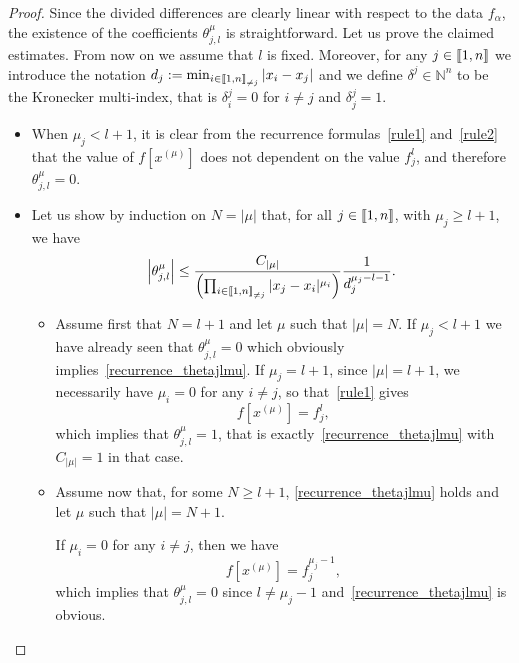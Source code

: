 \documentclass[11pt]{article}
\theoremstyle{definition}
\numberwithin{equation}{section}
\numberwithin{figure}{section}
\numberwithin{table}{section}
\newcommand{\llbracket}{\mathopen{[\mkern -2.7mu[}}
\newcommand{\rrbracket}{\mathclose{]\mkern -2.7mu]}}
\newcommand{\inter}[2]{\llbracket #1,#2 \rrbracket}
\newcommand{\interexclu}[3]{\llbracket #1,#2\rrbracket_{\neq #3}}
\newcommand{\N}{\mathbb{N}}
\begin{document}
\begin{proof}
Since the divided differences are clearly linear with respect to the data $f_\alpha$, the existence of the coefficients $\theta_{j,l}^\mu$ is straightforward. Let us prove the claimed estimates. From now on we assume that $l$ is fixed. Moreover, for any $j\in \inter{1}{n}$ we introduce the notation $d_j:= \min_{i\in\interexclu{1}{n}{j}} |x_i-x_j|$ and we define $\delta^j\in \N^n$ to be the Kronecker multi-index, that is $\delta_i^j=0$ for $i\neq j$ and $\delta_j^j=1$.
\begin{itemize}
\item When $\mu_j<l+1$, it is clear from the recurrence formulas~\eqref{rule1} and~\eqref{rule2} that the value of $f[x^{(\mu)}]$ does not dependent on the value $f_j^l$, and therefore $\theta_{j,l}^\mu=0$.
\item Let us show by induction on $N=|\mu|$ that, for all $j\in \inter{1}{n}$, with $\mu_j\geq l+1$, we have
\begin{equation}\label{recurrence_thetajlmu}
\left|\theta_{j,l}^\mu\right| \leq \frac{C_{|\mu|}}{\left(\prod_{i\in\interexclu{1}{n}{j}} |x_j-x_i|^{\mu_i}\right)} \frac{1}{d_j^{\mu_j-l-1}}.
\end{equation}
\begin{itemize}
\item Assume first that $N=l+1$ and let $\mu$ such that $|\mu|=N$. If $\mu_j<l+1$ we have already seen that $\theta_{j,l}^\mu=0$ which obviously implies~\eqref{recurrence_thetajlmu}. If $\mu_j=l+1$, since $|\mu|=l+1$, we necessarily have $\mu_i=0$ for any $i\neq j$, so that~\eqref{rule1} gives
\[
f\left[x^{(\mu)}\right] = f_j^l,
\]
which implies that $\theta_{j,l}^\mu=1$, that is exactly~\eqref{recurrence_thetajlmu} with $C_{|\mu|}=1$ in that case.
\item Assume now that, for some $N\geq l+1$, \eqref{recurrence_thetajlmu} holds and let $\mu$ such that $|\mu|=N+1$.

If $\mu_i=0$ for any $i\neq j$, then we have
\[
f\left[x^{(\mu)}\right] = f_j^{\mu_j-1},
\]
which implies that $\theta_{j,l}^\mu=0$ since $l\neq \mu_j-1$ and~\eqref{recurrence_thetajlmu} is obvious.


\end{itemize}
\end{itemize}
\end{proof}
\end{document}

